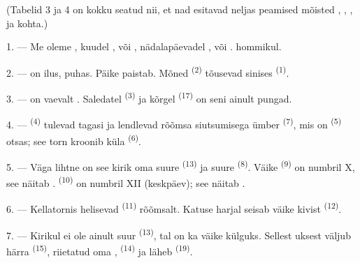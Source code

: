 \VUsaut{3.0mm}
\VUsaut{1.6mm}
\VUsaut{3.4mm}

(Tabelid 3 ja 4 on kokku seatud nii, et nad esitavad neljas 
peamised mõisted , , ,
 ja  kohta.)

\VUsaut{4.0mm}
\VUsaut{3.0mm}

\VUsaut{2.4mm}

\VUsaut{3.0mm}

1. --- Me oleme , kuudel ,  või
, nädalapäevadel ,  või
.  hommikul.

2. ---  on ilus,  puhas. Päike paistab. Mõned
 \textsuperscript{(2)} tõusevad sinises 
\textsuperscript{(1)}.

3. ---  on vaevalt . Saledatel 
\textsuperscript{(3)} ja kõrgel  \textsuperscript{(17)} on seni ainult
pungad.

4. ---  \textsuperscript{(4)} tulevad tagasi ja lendlevad rõõmsa
siutsumisega ümber  \textsuperscript{(7)}, mis on
 \textsuperscript{(5)} otsas; see torn kroonib küla
 \textsuperscript{(6)}.

\VUsaut{3.4mm}
\VUsaut{3.0mm}

5. --- Väga lihtne on see kirik oma suure  \textsuperscript{(13)} ja
suure  \textsuperscript{(8)}. Väike  \textsuperscript{(9)}
on numbril X, see näitab .  \textsuperscript{(10)} on numbril
XII (keskpäev); see näitab .

6. --- Kellatornis helisevad  \textsuperscript{(11)} rõõmsalt. Katuse
harjal seisab väike kivist  \textsuperscript{(12)}.

7. --- Kirikul ei ole ainult suur  \textsuperscript{(13)}, tal on ka
väike külguks. Sellest uksest väljub härra 
\textsuperscript{(15)}, riietatud oma , 
\textsuperscript{(14)} ja läheb  \textsuperscript{(19)}.

